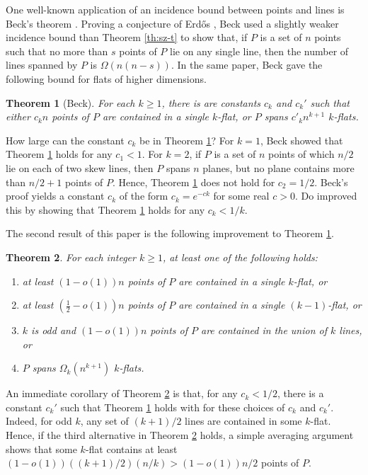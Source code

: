 \documentclass{article}
\newtheorem{theorem}{Theorem}
\begin{document}
One well-known application of an incidence bound between points and lines is Beck's theorem \cite{beck1983lattice}.
Proving a conjecture of Erd\H{o}s \cite{erdos1975some}, Beck used a slightly weaker incidence bound than Theorem \ref{th:sz-t} to show that, if $P$ is a set of $n$ points such that no more than $s$ points of $P$ lie on any single line, then the number of lines spanned by $P$ is $\Omega(n(n-s))$.
In the same paper, Beck gave the following bound for flats of higher dimensions.
\begin{theorem}[Beck]\label{th:beck}
For each $k \geq 1$, there is are constants $c_k$ and $c_k'$ such that either $c_k n$ points of $P$ are contained in a single $k$-flat, or $P$ spans $c'_k n^{k+1}$ $k$-flats.
\end{theorem}


How large can the constant $c_k$ be in Theorem \ref{th:beck}?
For $k=1$, Beck showed that Theorem \ref{th:beck} holds for any $c_1 < 1$.
For $k=2$, if $P$ is a set of $n$ points of which $n/2$ lie on each of two skew lines, then $P$ spans $n$ planes, but no plane contains more than $n/2 + 1$ points of $P$.
Hence, Theorem \ref{th:beck} does not hold for $c_2 = 1/2$.
Beck's proof yields a constant $c_k$ of the form $c_k = e^{-ck}$ for some real $c>0$.
Do \cite{do2016extending} improved this by showing that Theorem \ref{th:beck} holds for any $c_k < 1/k$.


The second result of this paper is the following improvement to Theorem \ref{th:beck}.

\begin{theorem}\label{th:improvedBeck}
	For each integer $k \geq 1$, at least one of the following holds:
	\begin{enumerate}
		\item at least $(1-o(1))n$ points of $P$ are contained in a single $k$-flat, or
		\item at least $(\frac{1}{2}-o(1))n$ points of $P$ are contained in a single $(k-1)$-flat, or
		\item $k$ is odd and $(1-o(1))n $ points of $P$ are contained in the union of $k$ lines, or
		\item  $P$ spans $\Omega_k(n^{k+1})$ $k$-flats.
	\end{enumerate}
\end{theorem}

An immediate corollary of Theorem \ref{th:improvedBeck} is that, for any $c_k < 1/2$, there is a constant $c_k'$ such that Theorem \ref{th:beck} holds with for these choices of $c_k$ and $c_k'$.
Indeed, for odd $k$, any set of $(k+1)/2$ lines are contained in some $k$-flat.
Hence, if the third alternative in Theorem \ref{th:improvedBeck} holds, a simple averaging argument shows that some $k$-flat contains at least $(1-o(1)) ((k+1)/2) (n/k) > (1-o(1)) n/2$ points of $P$.
\end{document}
